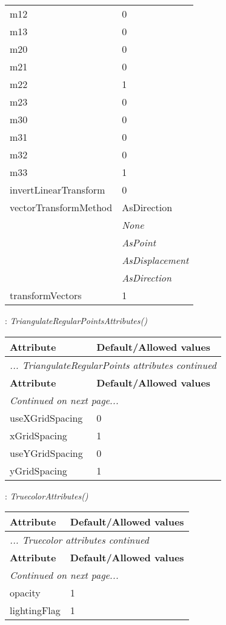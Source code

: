 \documentclass[10pt,a4paper]{report}
\begin{document}
\begin{longtable}{ll}
m12  &  0 \\
m13  &  0 \\
m20  &  0 \\
m21  &  0 \\
m22  &  1 \\
m23  &  0 \\
m30  &  0 \\
m31  &  0 \\
m32  &  0 \\
m33  &  1 \\
invertLinearTransform  &  0 \\
vectorTransformMethod  &  AsDirection   \\
 & {\it  None} \\
 & {\it  AsPoint} \\
 & {\it  AsDisplacement} \\
 & {\it  AsDirection} \\
transformVectors  &  1 \\
\end{longtable}

\newpage

{}
: {\it TriangulateRegularPointsAttributes() }\\[-3mm]

\begin{longtable}{ll}
{\bf Attribute} & {\bf Default/Allowed values} \\
\hline \hline
\endfirsthead
\multicolumn{2}{l}{{\it ... TriangulateRegularPoints attributes continued}} \\
{\bf Attribute} & {\bf Default/Allowed values} \\
\hline \hline
\endhead
\hline
\multicolumn{2}{l}{{\it Continued on next page...}} \\
\endfoot
\hline
\endlastfoot

useXGridSpacing  &  0 \\
xGridSpacing  &  1 \\
useYGridSpacing  &  0 \\
yGridSpacing  &  1 \\
\end{longtable}

\newpage

{}
: {\it TruecolorAttributes() }\\[-3mm]

\begin{longtable}{ll}
{\bf Attribute} & {\bf Default/Allowed values} \\
\hline \hline
\endfirsthead
\multicolumn{2}{l}{{\it ... Truecolor attributes continued}} \\
{\bf Attribute} & {\bf Default/Allowed values} \\
\hline \hline
\endhead
\hline
\multicolumn{2}{l}{{\it Continued on next page...}} \\
\endfoot
\hline
\endlastfoot

opacity  &  1 \\
lightingFlag  &  1 \\
\end{longtable}
\end{document}

